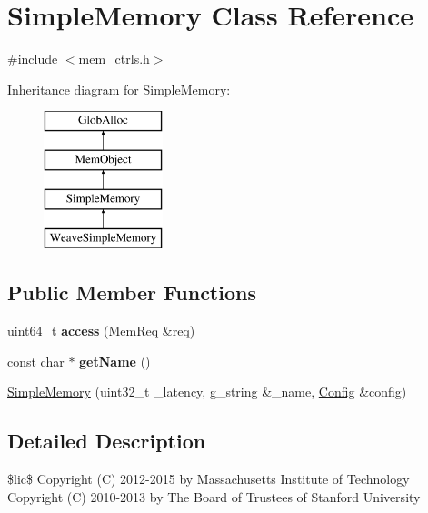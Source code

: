 \hypertarget{classSimpleMemory}{\section{Simple\-Memory Class Reference}
\label{classSimpleMemory}
}


{\ttfamily \#include $<$mem\-\_\-ctrls.\-h$>$}

Inheritance diagram for Simple\-Memory\-:\begin{figure}[H]
\begin{center}
\leavevmode
\includegraphics[height=4.000000cm]{classSimpleMemory}
\end{center}
\end{figure}
\subsection*{Public Member Functions}
\begin{DoxyCompactItemize}
\item 
\hypertarget{classSimpleMemory_ac039949875dbb0c771e6e329fa76a2ed}{uint64\-\_\-t {\bfseries access} (\hyperlink{structMemReq}{Mem\-Req} \&req)}\label{classSimpleMemory_ac039949875dbb0c771e6e329fa76a2ed}

\item 
\hypertarget{classSimpleMemory_a44ecdfffe9ce4f531ae109446fcc8096}{const char $\ast$ {\bfseries get\-Name} ()}\label{classSimpleMemory_a44ecdfffe9ce4f531ae109446fcc8096}

\item 
\hyperlink{classSimpleMemory_a1e09dc89a2c76c6c031334096b27235e}{Simple\-Memory} (uint32\-\_\-t \-\_\-latency, g\-\_\-string \&\-\_\-name, \hyperlink{classConfig}{Config} \&config)
\end{DoxyCompactItemize}


\subsection{Detailed Description}
\$lic\$ Copyright (C) 2012-\/2015 by Massachusetts Institute of Technology Copyright (C) 2010-\/2013 by The Board of Trustees of Stanford University

